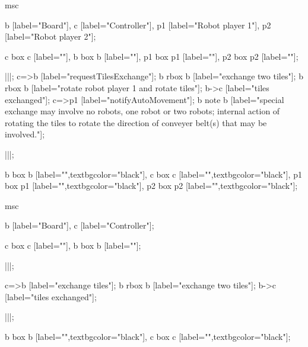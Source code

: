 \begin{msc}
msc
{

b [label="Board"],
c [label="Controller"],
p1 [label="Robot player 1"],
p2 [label="Robot player 2"];

c box c [label=""],
b box b [label=""],
p1 box p1 [label=""],
p2 box p2 [label=""];

|||;
c=>b [label="requestTilesExchange"];
b rbox b [label="exchange two tiles"];
b rbox b [label="rotate robot player 1 and rotate tiles"];
b->c [label="tiles exchanged"];
c=>p1 [label="notifyAutoMovement"];
b note b [label="special exchange may involve no robots, one robot or two robots; internal action of rotating the tiles to rotate the direction of conveyer belt(s) that may be involved."];

|||;

b box b [label="",textbgcolor="black"],
c box c [label="",textbgcolor="black"],
p1 box p1 [label="",textbgcolor="black"],
p2 box p2 [label="",textbgcolor="black"];

}
\end{msc}
\begin{msc}
msc
{

b [label="Board"],
c [label="Controller"];

c box c [label=""],
b box b [label=""];

|||;

c=>b [label="exchange tiles"];
b rbox b [label="exchange two tiles"];
b->c [label="tiles exchanged"];

|||;

b box b [label="",textbgcolor="black"],
c box c [label="",textbgcolor="black"];

}
\end{msc}
